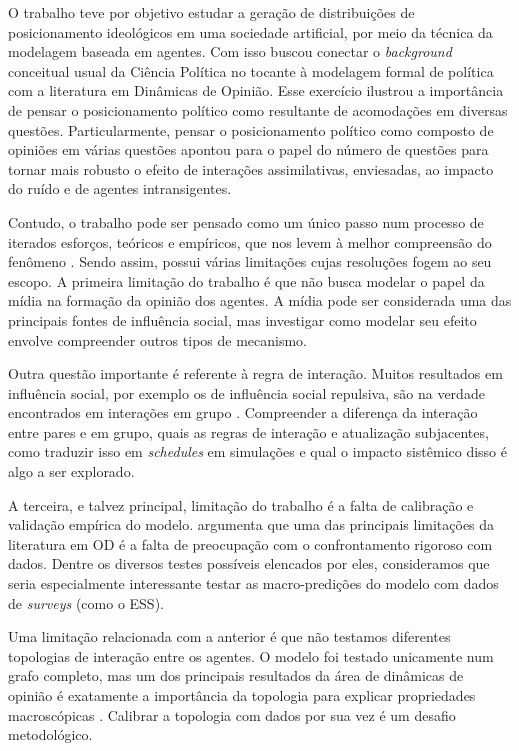 O trabalho teve por objetivo estudar a geração de distribuições de
posicionamento ideológicos em uma sociedade artificial, por meio da técnica da
modelagem baseada em agentes. Com isso buscou conectar o \textit{background}
conceitual usual da Ciência Política no tocante à modelagem formal de política
com a literatura em Dinâmicas de Opinião. Esse exercício ilustrou a importância
de pensar o posicionamento político como resultante de acomodações em diversas
questões. Particularmente, pensar o posicionamento político como composto de
opiniões em várias questões apontou para o papel do número de questões para
tornar mais robusto o efeito de interações assimilativas, enviesadas, ao impacto
do ruído e de agentes intransigentes.

Contudo, o trabalho pode ser pensado como um único passo num processo de
iterados esforços, teóricos e empíricos, que nos levem à melhor compreensão do
fenômeno \cite{wilensky2015introduction}. Sendo assim, possui várias limitações
cujas resoluções fogem ao seu escopo. A primeira limitação do trabalho é que não
busca modelar o papel da mídia na formação da opinião dos agentes. A mídia pode
ser considerada uma das principais fontes de influência social, mas investigar
como modelar seu efeito envolve compreender outros tipos de mecanismo.

Outra questão importante é referente à regra de interação. Muitos resultados em
influência social, por exemplo os de influência social repulsiva, são na verdade
encontrados em interações em grupo \cite{bramson2017understanding}. Compreender
a diferença da interação entre pares e em grupo, quais as regras de interação e
atualização subjacentes, como traduzir isso em \textit{schedules} em simulações
e qual o impacto sistêmico disso é algo a ser explorado.

A terceira, e talvez principal, limitação do trabalho é a falta de calibração e
validação empírica do modelo.  argumenta que uma das
principais limitações da literatura em OD é a falta de preocupação com o
confrontamento rigoroso com dados. Dentre os diversos testes possíveis elencados
por eles, consideramos que seria especialmente interessante testar as
macro-predições do modelo com dados de \textit{surveys} (como o ESS).

Uma limitação relacionada com a anterior é que não testamos diferentes
topologias de interação entre os agentes. O modelo foi testado unicamente num
grafo completo, mas um dos principais resultados da área de dinâmicas de opinião
é exatamente a importância da topologia para explicar propriedades macroscópicas
\cite{ball2002physical}. Calibrar a topologia com dados por sua vez é um
desafio metodológico.

